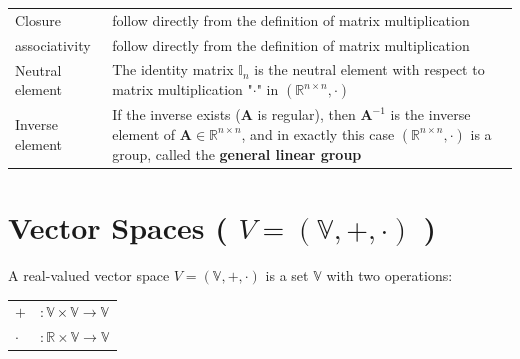 \begin{table}[h]
    \begin{tabular}{l p{7cm}}
        Closure & follow directly from the definition of matrix multiplication \\
        
        associativity & follow directly from the definition of matrix multiplication \\

        Neutral element & The identity matrix $\mathbb{I}_n$ is the neutral element with respect to matrix multiplication "$\cdot$" in $(\mathbb{R}^{n\times n}, \cdot)$ \\

        Inverse element & If the inverse exists ($\mathbf{A}$ is regular), then $\mathbf{A}^{-1}$ is the inverse element of $\mathbf{A} \in \mathbb{R}^{n\times n}$, and in exactly this case $(\mathbb{R}^{n\times n}, \cdot)$ is a group, called the \textbf{general linear group}\\
        
    \end{tabular}
\end{table}














\section{Vector Spaces ( $V = (\mathbb{V}, +, \cdot)$ ) \cite{mfml-1}}\label{Vector Spaces}

A real-valued vector space $V = (\mathbb{V}, +, \cdot)$ is a set $\mathbb{V}$ with two operations:

\begin{table}[H]
    \centering
    \begin{tabular}{l l}
        $+$ & $: \mathbb{V} \times \mathbb{V} \to \mathbb{V}$ \\

        $\cdot$ & $: \mathbb{R} \times \mathbb{V} \to \mathbb{V}$ \\

    \end{tabular}
\end{table}

